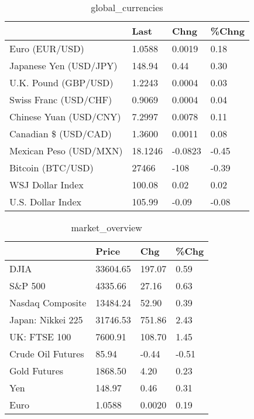 \documentclass{article}%
\begin{document}
%


\begin{table}[htbp]%
\caption{global\_currencies}%
\centering%
\begin{adjustbox}{width=1\textwidth}%
\begin{tabular}{llll}
\toprule
                       &    Last &    Chng & \%Chng \\
\midrule
        Euro (EUR/USD) &  1.0588 &  0.0019 &  0.18 \\
Japanese Yen (USD/JPY) &  148.94 &    0.44 &  0.30 \\
  U.K. Pound (GBP/USD) &  1.2243 &  0.0004 &  0.03 \\
 Swiss Franc (USD/CHF) &  0.9069 &  0.0004 &  0.04 \\
Chinese Yuan (USD/CNY) &  7.2997 &  0.0078 &  0.11 \\
  Canadian \$ (USD/CAD) &  1.3600 &  0.0011 &  0.08 \\
Mexican Peso (USD/MXN) & 18.1246 & -0.0823 & -0.45 \\
     Bitcoin (BTC/USD) &   27466 &    -108 & -0.39 \\
      WSJ Dollar Index &  100.08 &    0.02 &  0.02 \\
     U.S. Dollar Index &  105.99 &   -0.09 & -0.08 \\
\bottomrule
\end{tabular}
%
\end{adjustbox}%
\end{table}

%


\begin{table}[htbp]%
\caption{market\_overview}%
\centering%
\begin{adjustbox}{width=1\textwidth}%
\begin{tabular}{llll}
\toprule
                  &    Price &    Chg &  \%Chg \\
\midrule
             DJIA & 33604.65 & 197.07 &  0.59 \\
          S\&P 500 &  4335.66 &  27.16 &  0.63 \\
 Nasdaq Composite & 13484.24 &  52.90 &  0.39 \\
Japan: Nikkei 225 & 31746.53 & 751.86 &  2.43 \\
     UK: FTSE 100 &  7600.91 & 108.70 &  1.45 \\
Crude Oil Futures &    85.94 &  -0.44 & -0.51 \\
     Gold Futures &  1868.50 &   4.20 &  0.23 \\
              Yen &   148.97 &   0.46 &  0.31 \\
             Euro &   1.0588 & 0.0020 &  0.19 \\
\bottomrule
\end{tabular}
%
\end{adjustbox}%
\end{table}

%
\end{document}
